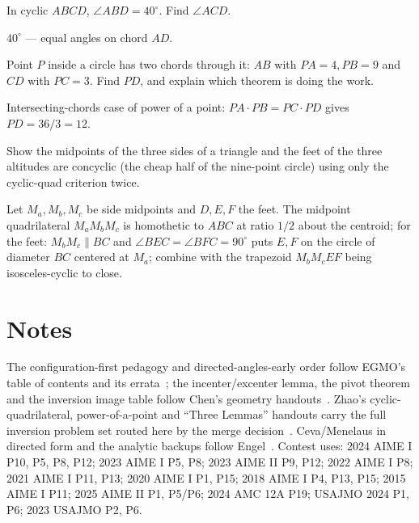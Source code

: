 \begin{exercise}[easy]\label{exr:ga13}
In cyclic $ABCD$, $\angle ABD = 40^\circ$. Find $\angle ACD$.
\end{exercise}
\begin{solution}
$40^\circ$ --- equal angles on chord $AD$.
\end{solution}
\begin{exercise}[medium]\label{exr:ga14}
Point $P$ inside a circle has two chords through it: $AB$ with
$PA=4,PB=9$ and $CD$ with $PC=3$. Find $PD$, and explain which theorem
is doing the work.
\end{exercise}
\begin{solution}
Intersecting-chords case of power of a point: $PA\cdot PB = PC\cdot PD$
gives $PD = 36/3 = 12$.
\end{solution}
\begin{exercise}[hard]\label{exr:ga15}
Show the midpoints of the three sides of a triangle and the feet of
the three altitudes are concyclic (the cheap half of the nine-point
circle) using only the cyclic-quad criterion twice.
\end{exercise}
\begin{solution}
Let $M_a,M_b,M_c$ be side midpoints and $D,E,F$ the feet. The midpoint
quadrilateral $M_aM_bM_c$ is homothetic to $ABC$ at ratio $1/2$ about
the centroid; for the feet: $M_bM_c \parallel BC$ and
$\angle BEC = \angle BFC = 90^\circ$ puts $E,F$ on the circle of
diameter $BC$ centered at $M_a$; combine with the trapezoid
$M_bM_cEF$ being isosceles-cyclic to close.
\end{solution}

\section*{Notes}
The configuration-first pedagogy and directed-angles-early order follow
EGMO's table of contents and its errata~\cite{egmo}; the
incenter/excenter lemma, the pivot theorem and the inversion image table
follow Chen's geometry handouts~\cite{chen-geom}. Zhao's
cyclic-quadrilateral, power-of-a-point and ``Three Lemmas'' handouts
carry the full inversion problem set routed here by the merge
decision~\cite{zhao}. Ceva/Menelaus in directed form and the analytic
backups follow Engel~\cite{engel}. Contest uses: 2024 AIME I P10, P5,
P8, P12; 2023 AIME I P5, P8; 2023 AIME II P9, P12; 2022 AIME I P8; 2021
AIME I P11, P13; 2020 AIME I P1, P15; 2018 AIME I P4, P13, P15; 2015
AIME I P11; 2025 AIME II P1, P5/P6; 2024 AMC 12A P19; USAJMO 2024 P1,
P6; 2023 USAJMO P2, P6.

